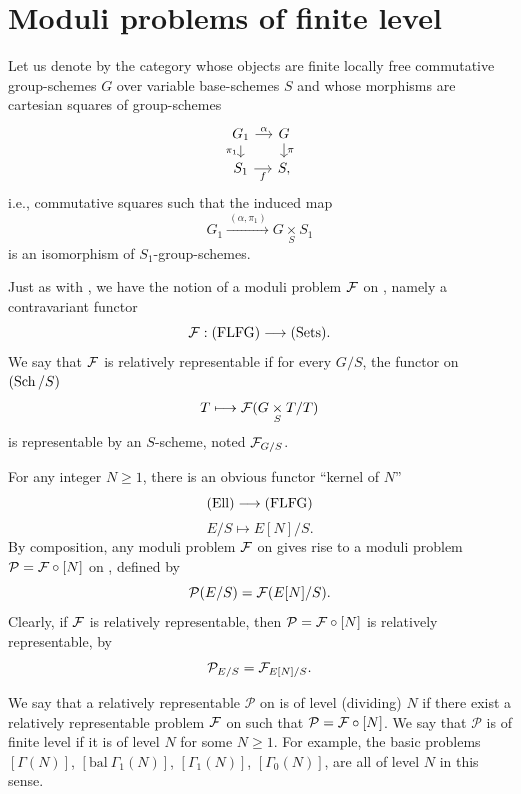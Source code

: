 \section{Moduli problems of finite level}
\label{sec:4.14}

\kmeqitem\label{item:4.14.1}
Let us denote by \FLFG the category whose objects are finite locally free commutative group-schemes $G$ over variable base-schemes $S$ and whose morphisms are cartesian squares of group-schemes
\[
\begin{tikzcd}[column sep=small, row sep=small]
G_1 \arrow[r, "\alpha"] \arrow[d, "\pi_1"'] & G \arrow[d, "\pi"] \\
S_1 \arrow[r, "f"'] & S,
\end{tikzcd}
\]
i.e., commutative squares such that the induced map
\[
G_1 \xrightarrow{\ (\alpha, \pi_1)\ } G \underset{S}{\times} S_1
\]
is an isomorphism of $S_1$-group-schemes.

Just as with \Ell, we have the notion of a moduli problem $\mathcal{F}$ on \FLFG, namely a contravariant functor
\[
\mathcal{F} : (\mathrm{FLFG}) \longrightarrow (\mathrm{Sets}).
\]
We say that $\mathcal{F}$ is relatively representable if for every $G/S$, the functor on $(\operatorname{Sch}/S)$
\[
T \longmapsto \mathcal{F}(G \underset{S}{\times} T/T)
\]
is representable by an $S$-scheme, noted $\mathcal{F}_{G/S}$.

\kmeqitem\label{item:4.14.2}
For any integer $N \ge 1$, there is an obvious functor ``kernel of $N$''
\[
(\mathrm{Ell}) \longrightarrow (\mathrm{FLFG})
\]
\[
E/S \longmapsto E[N]/S.
\]
By composition, any moduli problem $\mathcal{F}$ on \FLFG gives rise to a moduli problem $\mathcal{P} = \mathcal{F} \circ [N]$ on \Ell, defined by
\[
\mathcal{P}(E/S) = \mathcal{F}(E[N]/S).
\]
Clearly, if $\mathcal{F}$ is relatively representable, then $\mathcal{P} = \mathcal{F} \circ [N]$ is relatively representable, by
\[
\mathcal{P}_{E/S} = \mathcal{F}_{E[N]/S}.
\]

\kmeqitem\label{item:4.14.3}
We say that a relatively representable $\mathcal{P}$ on \Ell is of level (dividing) $N$ if there exist a relatively representable problem $\mathcal{F}$ on \FLFG such that $\mathcal{P} = \mathcal{F} \circ [N]$. We say that $\mathcal{P}$ is of finite level if it is of level $N$ for some $N \ge 1$. For example, the basic problems $[\Gamma(N)]$, $[\mathrm{bal}\ \Gamma_1(N)]$, $[\Gamma_1(N)]$, $[\Gamma_0(N)]$, are all of level $N$ in this sense.

\label{sec:A.4}

